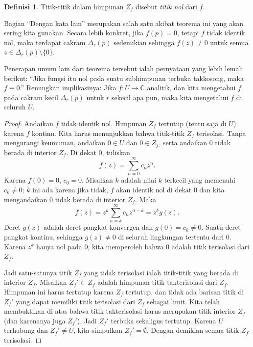 \documentclass[12pt,openany]{book}
\newcommand{\C}{{\mathbb{C}}}
\newcommand{\myquote}[1]{``#1''}
\theoremstyle{plain}
\theoremstyle{remark}
\theoremstyle{definition}
\newtheorem{defn}[thm]{Definisi}
\theoremstyle{exercise}
\theoremstyle{example}
\begin{document}
\begin{defn}
Titik-titik dalam himpunan $Z_f$ disebut \emph{titik nol} dari $f$.
\end{defn}

Bagian \myquote{Dengan kata lain} merupakan
salah satu akibat teorema ini yang akan sering kita gunakan.  Secara lebih
konkret, jika $f(p)=0$, tetapi $f$ tidak
identik nol, maka terdapat cakram $\Delta_r(p)$ sedemikian sehingga
$f(z) \neq 0$ untuk semua $z \in \Delta_r(p) \setminus \{ 0 \}$.

Penerapan umum lain dari teorema tersebut ialah pernyataan yang lebih lemah berikut:
\myquote{Jika fungsi itu nol pada suatu subhimpunan terbuka takkosong, maka $f \equiv 0$.}
Renungkan implikasinya: Jika $f \colon U \to \C$ analitik, dan kita mengetahui
$f$ pada cakram kecil $\Delta_r(p)$ untuk $r$ sekecil apa pun, maka
kita mengetahui $f$ di seluruh $U$.

\begin{proof}
Andaikan $f$ tidak identik nol.
Himpunan $Z_f$ tertutup (tentu saja di $U$) karena $f$ kontinu.  Kita harus menunjukkan
bahwa titik-titik $Z_f$ terisolasi.
Tanpa mengurangi keumuman, andaikan $0 \in U$ dan $0 \in Z_f$,
serta andaikan $0$ tidak berada di interior $Z_f$.
Di dekat $0$, tuliskan
\begin{equation*}
f(z) = \sum_{n=0}^\infty c_n z^n .
\end{equation*}
Karena $f(0) = 0$, $c_0 =0$.  Misalkan $k$ adalah nilai $k$ terkecil yang memenuhi $c_k \neq 0$;
$k$ ini ada karena jika tidak, $f$ akan identik nol di dekat $0$
dan kita mengandaikan $0$ tidak berada di interior $Z_f$.  Maka
\begin{equation*}
f(z) = z^k \sum_{n=k}^\infty c_n z^{n-k} = z^k g(z) .
\end{equation*}
Deret $g(z)$ adalah deret pangkat konvergen dan
$g(0) = c_k \neq 0$.
Suatu deret pangkat kontinu, sehingga $g(z) \neq 0$ di seluruh
lingkungan tertentu dari $0$.
Karena $z^k$ hanya nol pada $0$, kita memperoleh bahwa $0$ adalah titik terisolasi dari $Z_f$.

Jadi satu-satunya titik $Z_f$ yang tidak terisolasi ialah titik-titik yang berada di
interior $Z_f$.  Misalkan $Z_f' \subset Z_f$ adalah himpunan titik takterisolasi
dari $Z_f$.  Himpunan ini harus tertutup karena $Z_f$ tertutup, dan tidak ada barisan
titik di $Z_f'$ yang dapat
memiliki titik terisolasi dari $Z_f$ sebagai limit.
Kita telah membuktikan di atas bahwa titik
takterisolasi harus merupakan titik interior $Z_f$ (dan karenanya juga $Z_f'$).
Jadi $Z_f'$ terbuka sekaligus tertutup.  Karena $U$ terhubung dan
$Z_f' \neq U$, kita simpulkan $Z_f' = \emptyset$.
Dengan demikian semua titik $Z_f$ terisolasi.
\end{proof}
\end{document}
